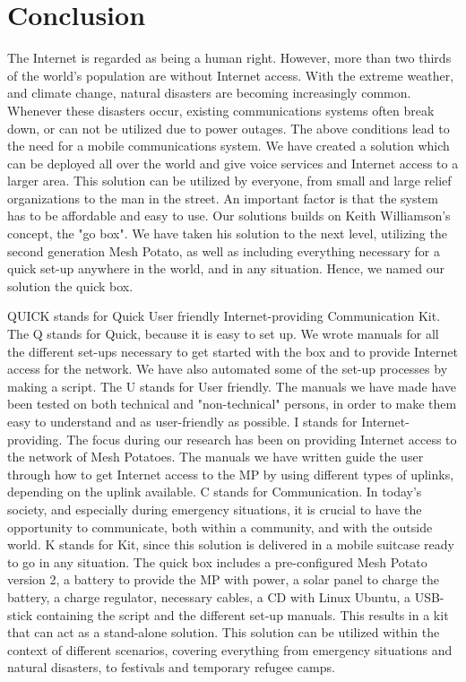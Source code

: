 \chapter{Conclusion}
\label{chp:conclusion} 

The Internet is regarded as being a human right. However, more than two thirds of the world's population are without Internet access. With the extreme weather, and climate change, natural disasters are becoming increasingly common. Whenever these disasters occur, existing communications systems often break down, or can not be utilized due to power outages. The above conditions lead to the need for a mobile communications system. We have created a solution which can be deployed all over the world and give voice services and Internet access to a larger area. This solution can be utilized by everyone, from small and large relief organizations to the man in the street. An important factor is that the system has to be affordable and easy to use. Our solutions builds on Keith Williamson's concept, the "go box". We have taken his solution to the next level, utilizing the second generation Mesh Potato, as well as including everything necessary for a quick set-up anywhere in the world, and in any situation. Hence, we named our solution the \gls{quick} box. 

QUICK stands for Quick User friendly Internet-providing Communication Kit. The Q stands for Quick, because it is easy to set up. We wrote manuals for all the different set-ups necessary to get started with the box and to provide Internet access for the network. We have also automated some of the set-up processes by making a script. The U stands for User friendly. The manuals we have made have been tested on both technical and "non-technical" persons, in order to make them easy to understand and as user-friendly as possible. I stands for Internet-providing. The focus during our research has been on providing Internet access to the network of Mesh Potatoes. The manuals we have written guide the user through how to get Internet access to the MP by using different types of uplinks, depending on the uplink available. C stands for Communication. In today's society, and especially during emergency situations, it is crucial to have the opportunity to communicate, both within a community, and with the outside world. K stands for Kit, since this solution is delivered in a mobile suitcase ready to go in any situation. The \gls{quick} box includes a pre-configured Mesh Potato version 2, a battery to provide the MP with power, a solar panel to charge the battery, a charge regulator, necessary cables, a CD with Linux Ubuntu, a USB-stick containing the script and the different set-up manuals. 
This results in a kit that can act as a stand-alone solution. This solution can be utilized within the context of different scenarios, covering everything from emergency situations and natural disasters, to festivals and temporary refugee camps.


